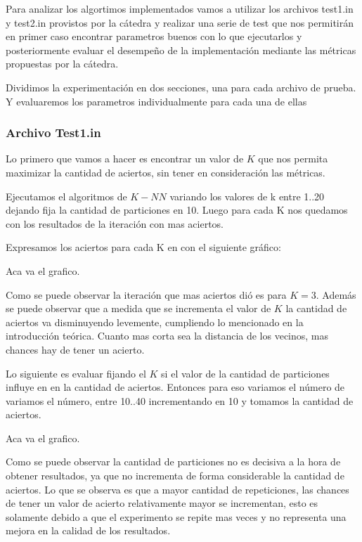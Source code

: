 Para analizar los algortimos implementados vamos a utilizar los archivos test1.in y test2.in provistos por la cátedra y realizar una serie de test que nos permitirán en primer caso encontrar parametros buenos con lo que ejecutarlos y posteriormente evaluar el desempeño de la implementación mediante las métricas propuestas por la cátedra.

Dividimos la experimentación en dos secciones, una para cada archivo de prueba. Y evaluaremos los parametros individualmente para cada una de ellas


\subsubsection {Archivo Test1.in}


Lo primero que vamos a hacer es encontrar un valor de $K$ que nos permita maximizar la cantidad de aciertos, sin tener en consideración las métricas.

Ejecutamos el algoritmos de $K-NN$ variando los valores de k entre {1..20} dejando fija la cantidad de particiones en 10. Luego para cada K nos quedamos con los resultados de la iteración con mas aciertos.

Expresamos los aciertos para cada K en con el siguiente gráfico:

Aca va el grafico.

Como se puede observar la iteración que mas aciertos dió es para $K = 3$. Además se puede observar que a medida que se incrementa el valor de $K$ la cantidad de aciertos va disminuyendo levemente, cumpliendo lo mencionado en la introducción teórica. Cuanto mas corta sea la distancia de los vecinos, mas chances hay de tener un acierto.

Lo siguiente es evaluar fijando el $K$ si el valor de la cantidad de particiones influye en en la cantidad de aciertos. Entonces para eso variamos el número de variamos el número, entre {10..40} incrementando en 10 y tomamos la cantidad de aciertos.

Aca va el grafico.

Como se puede observar la cantidad de particiones no es decisiva a la hora de obtener resultados, ya que no incrementa de forma considerable la cantidad de aciertos. Lo que se observa es que a mayor cantidad de repeticiones, las chances de tener un valor de acierto relativamente mayor se incrementan, esto es solamente debido a que el experimento se repite mas veces y no representa una mejora en la calidad de los resultados.

